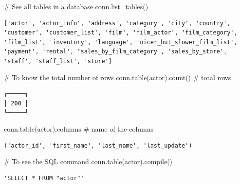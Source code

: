 \documentclass[
  letterpaper,
  DIV=11,
  numbers=noendperiod]{scrreprt}
\newenvironment{Shaded}{\begin{snugshade}}{\end{snugshade}}
\newcommand{\BuiltInTok}[1]{\textcolor[rgb]{0.00,0.23,0.31}{#1}}
\newcommand{\CommentTok}[1]{\textcolor[rgb]{0.37,0.37,0.37}{#1}}
\newcommand{\NormalTok}[1]{\textcolor[rgb]{0.00,0.23,0.31}{#1}}
\newcommand{\StringTok}[1]{\textcolor[rgb]{0.13,0.47,0.30}{#1}}
\begin{document}
\begin{Shaded}
\begin{Highlighting}[]
\CommentTok{\# See all tables in a database }
\NormalTok{conn.list\_tables()}
\end{Highlighting}
\end{Shaded}

\begin{verbatim}
['actor', 'actor_info', 'address', 'category', 'city', 'country', 'customer', 'customer_list', 'film', 'film_actor', 'film_category', 'film_list', 'inventory', 'language', 'nicer_but_slower_film_list', 'payment', 'rental', 'sales_by_film_category', 'sales_by_store', 'staff', 'staff_list', 'store']
\end{verbatim}

\begin{Shaded}
\begin{Highlighting}[]
\CommentTok{\# To know the total number of rows }
\NormalTok{conn.table(}\StringTok{\textquotesingle{}actor\textquotesingle{}}\NormalTok{).count() }\CommentTok{\# total rows }
\end{Highlighting}
\end{Shaded}

\begin{verbatim}
┌─────┐
│ 200 │
└─────┘
\end{verbatim}

\begin{Shaded}
\begin{Highlighting}[]
\NormalTok{conn.table(}\StringTok{\textquotesingle{}actor\textquotesingle{}}\NormalTok{).columns }\CommentTok{\# name of the columns }
\end{Highlighting}
\end{Shaded}

\begin{verbatim}
('actor_id', 'first_name', 'last_name', 'last_update')
\end{verbatim}

\begin{Shaded}
\begin{Highlighting}[]
\CommentTok{\# To see the SQL command }
\NormalTok{conn.table(}\StringTok{\textquotesingle{}actor\textquotesingle{}}\NormalTok{).}\BuiltInTok{compile}\NormalTok{()}
\end{Highlighting}
\end{Shaded}

\begin{verbatim}
'SELECT * FROM "actor"'
\end{verbatim}
\end{document}
